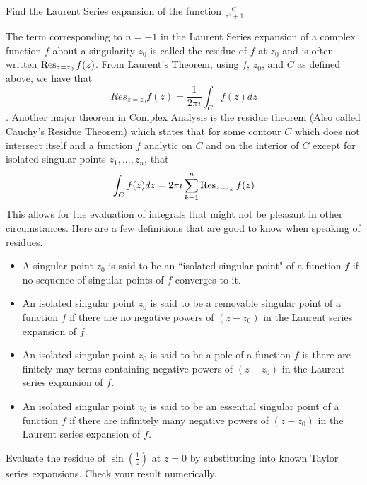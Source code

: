 \begin{problem}
Find the Laurent Series expansion of the function $\frac{e^{z}}{z^2 +1}$
\end{problem}


The term corresponding to $n=-1$ in the Laurent Series expansion of a complex function $f$ about a singularity $z_0$ is called the residue of $f$ at $z_0$ and is often written $\operatorname{Res}_{z=z_0} f(z)$.
From Laurent's Theorem, using $f$, $z_0$, and $C$ as defined above, we have that $$Res_{z=z_0} f(z) = \frac{1}{2 \pi i} \int_C f(z) dz$$.
Another major theorem in Complex Analysis is the residue theorem (Also called Cauchy's Residue Theorem) which states that for some contour $C$ which does not intersect itself and a function $f$ analytic on $C$ and on the interior of $C$ except for isolated singular points $z_1,...,z_n$, that 
$$\int_C f(z) dz = 2 \pi i \sum_{k=1}^{n} \operatorname{Res}_{z=z_k} f(z)$$
This allows for the evaluation of integrals that might not be pleasant in other circumstances.
Here are a few definitions that are good to know when speaking of residues.
\begin{itemize}
\item A singular point $z_0$ is said to be an ``isolated singular point" of a function $f$ if no sequence of singular points of $f$ converges to it.
\item An isolated singular point $z_0$ is said to be a removable singular point of a function $f$ if there are no negative powers of $(z-z_0)$ in the Laurent series expansion of $f$.
\item An isolated singular point $z_0$ is said to be a pole of a function $f$ is there are finitely may terms containing negative powers of $(z-z_0)$ in the Laurent series expansion of $f$. 
\item An isolated singular point $z_0$ is said to be an essential singular point of a function $f$ if there are infinitely many negative powers of $(z-z_0)$ in the Laurent series expansion of $f$.
\end{itemize}

\begin{problem}
Evaluate the residue of $\sin(\frac{1}{z})$ at $z=0$ by substituting into known Taylor series expansions.
Check your result numerically.
\end{problem}

